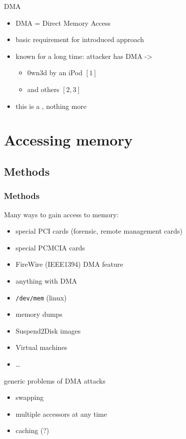 \documentclass{beamer}
\newenvironment{itemizeframe}[1]
  {\begin{frame}{#1}\startitemizeframe}
  {\stopitemizeframe\end{frame}}
\newcommand\startitemizeframe{\begin{itemize}}
\newcommand\stopitemizeframe{\end{itemize}}
\begin{document}
		\begin{itemizeframe}{DMA}
			\item DMA = Direct Memory Access
			\item basic requirement for introduced approach
			\item known for a long time: attacker has DMA -> 
				\begin{itemize}
					\item 0wn3d by an iPod $[1]$
					\item and others $[2,3]$
				\end{itemize}
			\item this is a , nothing more
		\end{itemizeframe}

\section{Accessing memory}

	\subsection{Methods}

		\begin{frame} \frametitle{Methods}
			Many ways to gain access to memory:
			\begin{itemize}
				\item special PCI cards (forensic, remote management cards)
				\item special PCMCIA cards
				\item FireWire (IEEE1394) DMA feature
				\item anything with DMA
				\item \texttt{/dev/mem} (linux)
				\item memory dumps
				\item Suspend2Disk images
				\item Virtual machines
				\item \ldots
			\end{itemize}
		\end{frame}

		\begin{itemizeframe}{generic problems of DMA attacks}
			\item swapping
			\item multiple accessors at any time
			\item caching (?)
		\end{itemizeframe}
\end{document}
